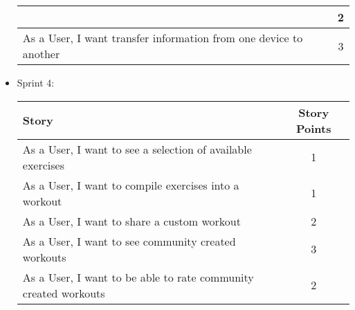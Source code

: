 \documentclass[12pt,letterpaper]{article}
\begin{document}
\begin{itemize}
\begin{tabular}{|l|c|}
					 & 2 \\ 
					\hline 
					As a User, I want transfer information from one device to another & 3 \\ 
					\hline 
					\end{tabular} 
				\item Sprint 4:\\
					\begin{tabular}{|l|c|}
					\hline 
					Story & Story Points \\ 
					\hline 
					As a User, I want to see a selection of available exercises & 1 \\ 
					\hline 
					As a User, I want to compile exercises into a workout & 1 \\ 
					\hline 
					As a User, I want to share a custom workout & 2 \\ 
					\hline 
					As a User, I want to see community created workouts & 3 \\ 
					\hline 
					As a User, I want to be able to rate community created workouts & 2 \\ 
					\hline 
					\end{tabular} 
			\end{itemize}
\end{document}
